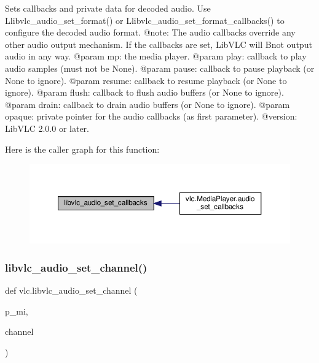 \begin{DoxyVerb}Sets callbacks and private data for decoded audio.
Use L{libvlc_audio_set_format}() or L{libvlc_audio_set_format_callbacks}()
to configure the decoded audio format.
@note: The audio callbacks override any other audio output mechanism.
If the callbacks are set, LibVLC will B{not} output audio in any way.
@param mp: the media player.
@param play: callback to play audio samples (must not be None).
@param pause: callback to pause playback (or None to ignore).
@param resume: callback to resume playback (or None to ignore).
@param flush: callback to flush audio buffers (or None to ignore).
@param drain: callback to drain audio buffers (or None to ignore).
@param opaque: private pointer for the audio callbacks (as first parameter).
@version: LibVLC 2.0.0 or later.
\end{DoxyVerb}
 Here is the caller graph for this function\+:
\nopagebreak
\begin{figure}[H]
\begin{center}
\leavevmode
\includegraphics[width=350pt]{namespacevlc_a8edc679f928c8870c5412270fea57b6c_icgraph}
\end{center}
\end{figure}
\mbox{\label{namespacevlc_abc0358f7a4053006f13577861532937c}} 
\subsubsection{\texorpdfstring{libvlc\+\_\+audio\+\_\+set\+\_\+channel()}{libvlc\_audio\_set\_channel()}}
{\footnotesize\ttfamily def vlc.\+libvlc\+\_\+audio\+\_\+set\+\_\+channel (\begin{DoxyParamCaption}\item[{}]{p\+\_\+mi,  }\item[{}]{channel }\end{DoxyParamCaption})}

